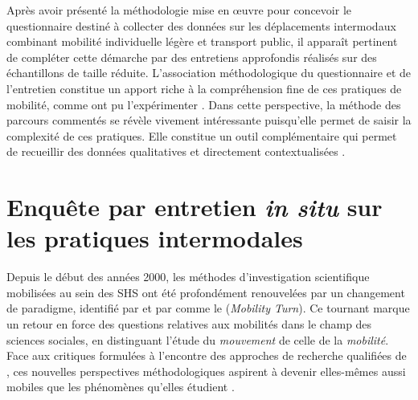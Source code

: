 \begin{refsegment}
Après avoir présenté la méthodologie mise en œuvre pour concevoir le questionnaire destiné à collecter des données sur les déplacements intermodaux combinant mobilité individuelle légère et transport public, il apparaît pertinent de compléter cette démarche par des entretiens approfondis réalisés sur des échantillons de taille réduite. L'association méthodologique du questionnaire et de l'entretien constitue un apport riche à la compréhension fine de ces pratiques de mobilité, comme ont pu l'expérimenter \textcolor{blue}{\textcite[97]{dureau_lobservation_2014}}. Dans cette perspective, la méthode des parcours commentés se révèle vivement intéressante puisqu'elle permet de saisir la complexité de ces pratiques. Elle constitue un outil complémentaire qui permet de recueillir des données qualitatives et  directement contextualisées \textcolor{blue}{\autocite[109]{bergeron_uncovering_2014}}.%

    \newpage
\section{Enquête par entretien \textsl{in situ} sur les pratiques intermodales
    \label{chap3:parcours-commente}
    }

Depuis le début des années 2000, les méthodes d’investigation scientifique mobilisées au sein des \acrfull{SHS} ont été profondément renouvelées par un changement de paradigme, identifié par \textcolor{blue}{\textcite[207]{sheller_new_2006}} et par \textcolor{blue}{\textcite{bonnet_territoires_2000}} comme le  (\textsl{Mobility Turn}). Ce tournant marque un retour en force des questions relatives aux mobilités dans le champ des sciences sociales, en distinguant l’étude du \textsl{mouvement} de celle de la \textsl{mobilité}. Face aux critiques formulées à l’encontre des approches de recherche qualifiées de , ces nouvelles perspectives méthodologiques aspirent à devenir elles-mêmes aussi mobiles que les phénomènes qu’elles étudient \textcolor{blue}{\autocite[207]{buscher_mobile_2009}}.%


\end{refsegment}
